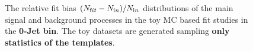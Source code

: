 \begin{figure}[!hbtp]
{} 

\caption{The relative fit bias $(N_{\text fit} - N_{\text in})/N_{\text in}$ distributions 
of the main signal and background processes in the toy MC based fit studies in the {\bf 0-Jet bin}. 
The toy datasets are generated sampling {\bf only statistics of the templates}. }
\label{fig:toyfit_statonly_0j}
\end{figure}



